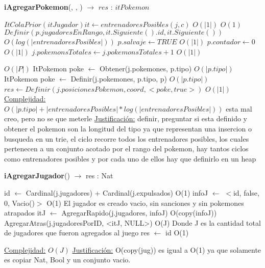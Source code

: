 \begin{algorithm}[H]{\textbf{iAgregarPokemon}(, , ) $\to$ $res$ : $itPokemon$}
	\begin{algorithmic}
	
	\State $ItColaPrior(itJugador) it \gets entrenadoresPosibles(j,c) $ \Comment $O(|1|)$
	 \Comment $O(1)$
		\State $Definir(p.jugadoresEnRango, it.Siguiente().id, it.Siguiente()) $ \Comment $O(log(|entrenadoresPosibles|))$
	\EndWhile
	\State $p.salvaje \gets TRUE $ \Comment $O(|1|)$
	\State $p.contador \gets 0 $ \Comment $O(|1|)$
	\State $j.pokemonsTotales \gets j.pokemonsTotales+1 $ \Comment $O(|1|)$
	
	 \Comment $O(|P|)$
		\State ItPokemon poke $\gets$ Obtener(j.pokemones, p.tipo)  \Comment $O(|p.tipo|)$
	\Else
		\State ItPokemon poke $\gets$ Definir(j.pokemones, p.tipo, p) \Comment $O(|p.tipo|)$
	\EndIf
	\State $res \gets Definir(j.posicionesPokemon, coord, <poke,true>) $ \Comment $O(|1|)$
		\medskip
		\Statex \underline{Complejidad:} $O(|p.tipo| + |entrenadoresPosibles| * log(|entrenadoresPosibles|))$
		 esta mal creo, pero no se que meterle
		\Statex \underline{Justificación:}  definir, preguntar si esta definido 
		y obtener el pokemon son la longitud del tipo ya que representan una insercion 
		o busqueda en un trie, el ciclo recorre todos los entrenadores posibles, 
		los cuales pertenecen a un conjunto acotado por el rango del pokemon, 
		hay tantos ciclos como entrenadores posibles y por cada uno de ellos 
		hay que definirlo en un heap 
    \end{algorithmic}
\end{algorithm}

\begin{algorithm}[H]{\textbf{iAgregarJugador}() $\to$ res : Nat}
	\begin{algorithmic}
		\State id $\gets$ Cardinal(j.jugadores) + Cardinal(j.expulsados) \Comment O(1)
		\State infoJ $\gets$ $<$id, false, 0, Vacio()$>$ \Comment O(1) {El jugador es creado vacio, sin sanciones y sin pokemones atrapados}
		\State itJ $\gets$ AgregarRapido(j.jugadores, infoJ) \Comment O(copy(infoJ))
		\State AgregarAtras(j.jugadoresPorID, <itJ, NULL>) \Comment O(J) {Donde J es la cantidad total de jugadores que fueron agregados al juego} %
		\State res $\gets$ id \Comment O(1)
					
		\medskip
		\Statex \underline{Complejidad:} $O(J)$
		\Statex \underline{Justificación:} O(copy(jug)) es igual a O(1) ya que solamente es copiar Nat, Bool y un conjunto vacio.
    \end{algorithmic}
\end{algorithm}

